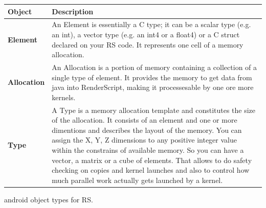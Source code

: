 \documentclass[a4paper,10pt]{article}
\makeatletter
\newenvironment{tablehere}{\def\@captype{table}}{}
\makeatother
\begin{document}
\begin{multicols}{2}
\begin{tablehere}
\centering
\begin{tabularx}{0.5\textwidth}{lX}
\toprule
Object & Description \\
\midrule
\textbf{Element} & An Element is essentially a C type; it can be a scalar type (e.g. an int), a vector type (e.g. an int4 or a float4) or a C struct declared on your RS code.
It represents one cell of a memory allocation. \\
\midrule
\textbf{Allocation} & An Allocation is a portion of memory containing a collection of a single type of element. It provides the memory to get data from java into RenderScript, making it processesable by one ore more kernels. \\
\midrule
\textbf{Type} & A Type is a memory allocation template and constitutes the size of the allocation. It consists of an element and one or more dimentions and describes the layout of the memory.
You can assign the X, Y, Z dimensions to any positive integer value within the constrains of available memory. So you can have a vector, a matrix or a cube of elements. That allows to do safety checking on copies and kernel launches and also to control how much parallel work actually gets launched by a kernel. \\
\bottomrule
\end{tabularx}
\caption{android object types for RS.}
\label{tab:basicRS}
\end{tablehere}


\end{multicols}
\end{document}
